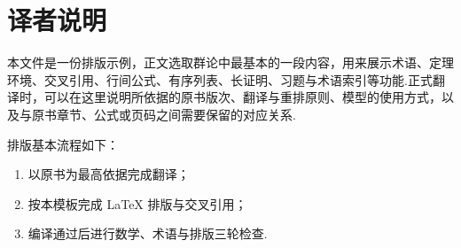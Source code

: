
\chapter*{译者说明}

本文件是一份排版示例，正文选取群论中最基本的一段内容，用来展示术语、定理环境、交叉引用、行间公式、有序列表、长证明、习题与术语索引等功能.正式翻译时，可以在这里说明所依据的原书版次、翻译与重排原则、模型的使用方式，以及与原书章节、公式或页码之间需要保留的对应关系.

排版基本流程如下：
\begin{enumerate}
    \item 以原书为最高依据完成翻译；
    \item 按本模板完成 LaTeX 排版与交叉引用；
    \item 编译通过后进行数学、术语与排版三轮检查.
\end{enumerate}

\vspace{0.5cm}
\hfill \Translator

\hfill \TranslationDate
